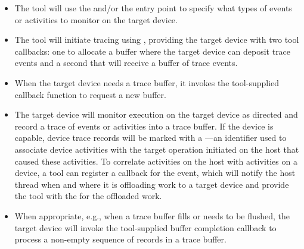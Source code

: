 \begin{itemize}
\item The tool will use the 
  and/or the  entry point to specify what
  types of events or activities to monitor on the target device.
\item The tool will initiate tracing using ,
  providing the target device with two tool callbacks: one to allocate
  a buffer where the target device can deposit trace events and a
  second that will receive a buffer of trace events. 
\item When the target device needs a trace buffer, it invokes the
  tool-supplied callback function to request a new buffer.
\item The target device will monitor execution on the target device as
  directed and record a trace of events or activities into a trace
  buffer. If the device is capable, device trace records will be
  marked with a ---an identifier used to associate
  device activities with the target operation initiated on the host
  that caused these activities.  To correlate activities on the host
  with activities on a device, a tool can register a
  callback for the  event, which
  will notify the host thread when and where it is offloading work to a
  target device and provide the tool with the  for
  the offloaded work.
\item When appropriate, e.g., when a trace buffer fills or needs to be
  flushed, the target device will invoke the tool-supplied buffer
  completion callback to process a non-empty sequence of
  records in a trace buffer. 



\end{itemize}
